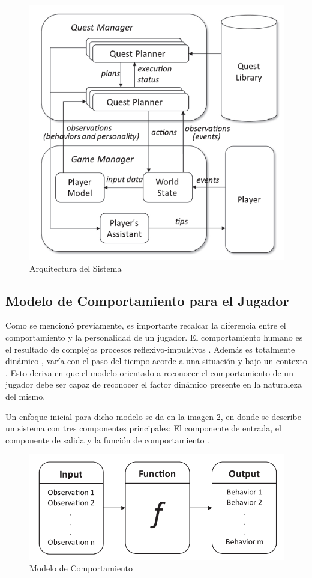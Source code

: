 \documentclass[conference]{IEEEtran}
\begin{document}
\begin{figure}[tph!]
\centerline{\includegraphics[totalheight=8cm]{1}}
    \caption{Arquitectura del Sistema}
    \label{fig:red1}
\end{figure}

\subsection{Modelo de Comportamiento para el Jugador }

Como se mencionó previamente, es importante recalcar la diferencia entre el comportamiento y la personalidad de un jugador. El comportamiento humano es el resultado de complejos procesos reflexivo-impulsivos \citep{strack2004reflective}. Además es totalmente dinámico , varía con el paso del tiempo acorde a una situación y bajo un contexto \citep{mishra2008psychology}. Esto deriva en que el modelo orientado a reconocer el comportamiento de un jugador debe ser capaz de reconocer el factor dinámico presente en la naturaleza del mismo.

Un enfoque inicial para dicho modelo se da en la imagen \ref{fig:red2}, en donde se describe un sistema con tres componentes principales: El componente de entrada, el componente de salida y la función de comportamiento . 

\begin{figure}[tph!]
\centerline{\includegraphics[totalheight=3cm]{2}}
    \caption{Modelo de Comportamiento}
    \label{fig:red2}
\end{figure}
\end{document}
